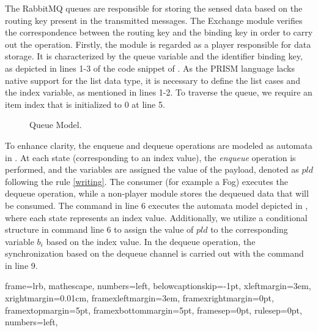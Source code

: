 The RabbitMQ queues are responsible for storing the sensed data based on the routing key present in the transmitted messages. The Exchange module verifies the correspondence between the routing key and the binding key in order to carry out the operation. Firstly, the  module is regarded as a player responsible for data storage. It is characterized by the queue variable and the identifier binding key, as depicted in lines 1-3 of the code snippet of . As the PRISM language lacks native support for the list data type, it is necessary to define the list cases and the index variable, as mentioned in lines 1-2. To traverse the queue, we require an item index that is initialized to 0 at line 5. 
\noindent
\begin{figure}[!htb]
    \centering
    
    \caption{Queue Model.}
    \label{fig:queue}
\end{figure} 

To enhance clarity, the enqueue and dequeue operations are modeled as automata in . At each state (corresponding to an index value), the \emph{enqueue} operation is performed, and the variables  are assigned the value of the payload, denoted as $pld$ following the rule \ref{writing}. The consumer (for example a Fog) executes the dequeue operation, while a non-player module stores the dequeued data that will be consumed. The command in line 6 executes the automata model depicted in , where each state represents an index value. Additionally, we utilize a conditional structure in command line 6 to assign the value of $pld$ to the corresponding variable $b_{i}$ based on the index value. In the dequeue operation, the synchronization based on the dequeue channel is carried out with the command in line 9.

{
	frame=lrb,         
	mathescape,
	numbers=left,
	belowcaptionskip=-1pt,
    xleftmargin=3em,
		xrightmargin=0.01cm,
    framexleftmargin=3em,
	framexrightmargin=0pt,
	framextopmargin=5pt,
	framexbottommargin=5pt,
	framesep=0pt,
	rulesep=0pt,
	numbers=left,
}
    



